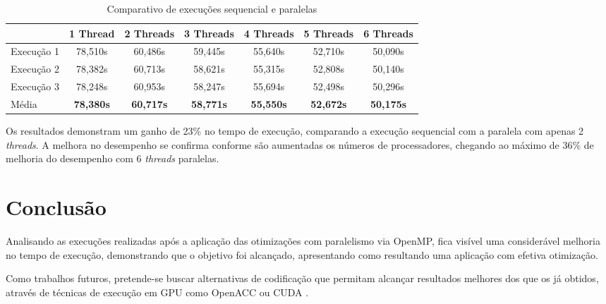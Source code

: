 \documentclass[12pt]{article}
\begin{document}
\begin{table} [htb]
    \renewcommand{\arraystretch}{1.4}
    \centering
    \caption{Comparativo de execuções sequencial e paralelas}
    \label{tab_execuções}
    
    \begin{adjustbox}{width=\textwidth}
        \begin{tabular}{| l | c | c | c | c | c | c |}
            \hline

                        &\textbf{1 Thread}   &\textbf{2 Threads}  &\textbf{3 Threads}  &\textbf{4 Threads}   &\textbf{5 Threads}  &\textbf{6 Threads} \\
            \hline
            Execução 1  &   78,510s     &60,486s    &59,445s    &55,640s    &52,710s      &50,090s \\
            Execução 2  &   78,382s     &60,713s    &58,621s    &55,315s    &52,808s      &50,140s \\
            Execução 3  &   78,248s     &60,953s    &58,247s    &55,694s    &52,498s      &50,296s \\
            \hline
            Média      &\textbf{78,380s}   &\textbf{60,717s}   &\textbf{58,771s}   &\textbf{55,550s}  &\textbf{52,672s}  &\textbf{50,175s}\\
            
            \hline
        \end{tabular}
    \end{adjustbox}
\end{table}

Os resultados demonstram um ganho de 23\% no tempo de execução, comparando a execução sequencial com a paralela com apenas 2 \textit{threads}. A melhora no desempenho se confirma conforme são aumentadas os números de processadores, chegando ao máximo de 36\% de melhoria do desempenho com 6 \textit{threads} paralelas.



\section{Conclusão} \label{sec:conclusoes}
Analisando as execuções realizadas após a aplicação das otimizações com paralelismo via OpenMP, fica visível uma considerável melhoria no tempo de execução, demonstrando que o objetivo foi alcançado, apresentando como resultando uma aplicação com efetiva otimização.

Como trabalhos futuros, pretende-se buscar alternativas de codificação que permitam alcançar resultados melhores dos que os já obtidos, através de técnicas de execução em GPU como OpenACC ou CUDA \cite{hoshino2013cuda}.



\end{document}
